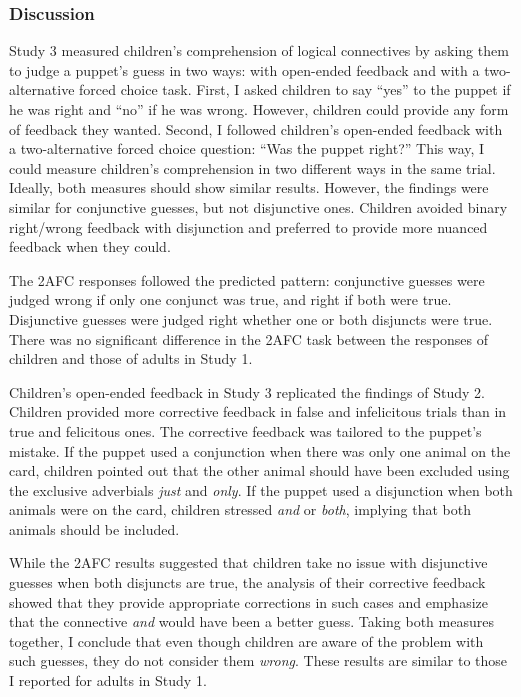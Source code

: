 \documentclass[man]{apa6}
\theoremstyle{definition}
\theoremstyle{definition}
\theoremstyle{definition}
\theoremstyle{remark}
\begin{document}
\subsubsection{Discussion}\label{discussion-2}

Study 3 measured children's comprehension of logical connectives by
asking them to judge a puppet's guess in two ways: with open-ended
feedback and with a two-alternative forced choice task. First, I asked
children to say \enquote{yes} to the puppet if he was right and
\enquote{no} if he was wrong. However, children could provide any form
of feedback they wanted. Second, I followed children's open-ended
feedback with a two-alternative forced choice question: \enquote{Was the
puppet right?} This way, I could measure children's comprehension in two
different ways in the same trial. Ideally, both measures should show
similar results. However, the findings were similar for conjunctive
guesses, but not disjunctive ones. Children avoided binary right/wrong
feedback with disjunction and preferred to provide more nuanced feedback
when they could.

The 2AFC responses followed the predicted pattern: conjunctive guesses
were judged wrong if only one conjunct was true, and right if both were
true. Disjunctive guesses were judged right whether one or both
disjuncts were true. There was no significant difference in the 2AFC
task between the responses of children and those of adults in Study 1.

Children's open-ended feedback in Study 3 replicated the findings of
Study 2. Children provided more corrective feedback in false and
infelicitous trials than in true and felicitous ones. The corrective
feedback was tailored to the puppet's mistake. If the puppet used a
conjunction when there was only one animal on the card, children pointed
out that the other animal should have been excluded using the exclusive
adverbials \emph{just} and \emph{only}. If the puppet used a disjunction
when both animals were on the card, children stressed \emph{and} or
\emph{both}, implying that both animals should be included.

While the 2AFC results suggested that children take no issue with
disjunctive guesses when both disjuncts are true, the analysis of their
corrective feedback showed that they provide appropriate corrections in
such cases and emphasize that the connective \emph{and} would have been
a better guess. Taking both measures together, I conclude that even
though children are aware of the problem with such guesses, they do not
consider them \emph{wrong}. These results are similar to those I
reported for adults in Study 1.
\end{document}

